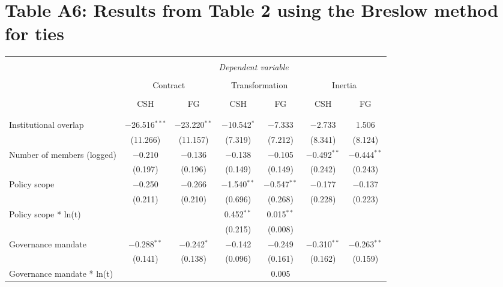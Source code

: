 \documentclass[12pt]{article}
\begin{document}
\newpage

\section*{Table A6: Results from Table 2 using the Breslow method for ties}


\begin{table}[H] 
\centering 
\footnotesize
\label{tab:combined_risks} 
\begin{tabular}{@{\extracolsep{5pt}}lcccccc} 
\\[-1.8ex]\hline 
\hline \\[-1.8ex] 
 & \multicolumn{6}{c}{\textit{Dependent variable}} \\ 
\cline{2-7} 
\\[-1.8ex] 
 & \multicolumn{2}{c}{Contract} & \multicolumn{2}{c}{Transformation} & \multicolumn{2}{c}{Inertia} \\ 
\cline{2-3} \cline{4-5} \cline{6-7} 
\\[-1.8ex] 
 & CSH & FG & CSH & FG & CSH & FG \\ 
\\[-1.8ex] 
\hline \\[-1.8ex] 
Institutional overlap & $-$26.516$^{***}$ & $-$23.220$^{**}$ & $-$10.542$^{*}$ & $-$7.333 & $-$2.733 & 1.506 \\ 
 & (11.266) & (11.157) & (7.319) & (7.212) & (8.341) & (8.124) \\ 
Number of members (logged) & $-$0.210 & $-$0.136 & $-$0.138 & $-$0.105 & $-$0.492$^{**}$ & $-$0.444$^{**}$ \\  
 & (0.197) & (0.196) & (0.149) & (0.149) & (0.242) & (0.243) \\ 
Policy scope  & $-$0.250 & $-$0.266 & $-$1.540$^{**}$ & $-$0.547$^{**}$ & $-$0.177 & $-$0.137 \\ 
 & (0.211) & (0.210) & (0.696) & (0.268) & (0.228) & (0.223) \\ 
Policy scope * ln(t) &  &  & 0.452$^{**}$ & 0.015$^{**}$ &  & \\ 
 &  &  & (0.215) & (0.008) &  & \\ 
Governance mandate & $-$0.288$^{**}$ & $-$0.242$^{*}$ & $-$0.142 & $-$0.249 & $-$0.310$^{**}$ & $-$0.263$^{**}$ \\ 
 & (0.141) & (0.138) & (0.096) & (0.161) & (0.162) & (0.159) \\ 
Governance mandate * ln(t) &  &  &  & 0.005 &  & \\ 

\end{tabular}
\end{table}
\end{document}
